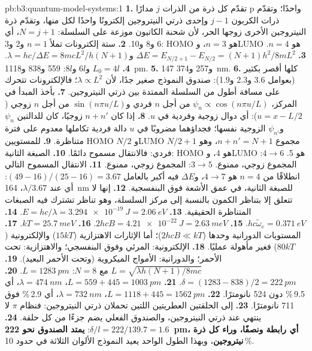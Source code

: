 \begin{solution}{pb:b3:quantum-model-systems:1}
\textbf{1.} تقدّم كل ذرة من الذرات $j$ مدارًا p واحدًا؛ وتقدّم ذرات الكربون $j - 1$ 
وإحدى ذرتي النيتروجين إلكترونًا واحدًا لكل منها، وتقدّم ذرة النيتروجين الأخرى زوجها الحر،
لأن شحنة الكاتيون موزعة على السلسلة: $N = j + 1$، أي 6
و8 و10.
\textbf{2.} ستة إلكترونات تملأ $n = 1$ و2 و3: HOMO هو $n = 3$، وLUMO هو $n = 4$.
\textbf{3.} $\Delta E = E_{N/2+1} - E_{N/2} = (N+1)h^2/8mL^2$ و$\lambda =
hc/\Delta E = 8mcL^2/h(N+1)$.
\textbf{4.} $L_0 = 4l$ و$6l$ و$8l$: 559 و838 و\qty{1118}{pm}.
\textbf{5.} 147 و257 و\qty{374}{nm}.
\textbf{6.} كلها أقصر بكثير (بعوامل 3.6 و2.3 و1.9): صندوق النموذج
صغير جدًا، لأن $\lambda \propto L^2$؛ فالإلكترونات تتحرك على مسافة أطول
من السلسلة الممتدة بين ذرتي النيتروجين.
\textbf{7.} بأخذ المبدأ في المركز، $\psi_n \propto \cos(n\pi u/L)$ من أجل
$n$ فردي و$\sin(n\pi u/L)$ من أجل $n$ زوجي ($u = x - L/2$): أي دوال زوجية وفردية
في $u$.
\textbf{8.} إذا كان $n + n'$ زوجيًا، كان للدالتين $\psi_n$ و$\psi_{n'}$ الزوجية نفسها؛
فجداؤهما مضروبًا في $u$ دالة فردية تكاملها معدوم على فترة
متناظرة.
\textbf{9.} للمستويين HOMO $N/2$ وLUMO $N/2 + 1$ مجموع $n + n' = N + 1$، وهو فردي: فالانتقال
مسموح دائمًا.
\textbf{10.} الصبغة الثانية: HOMO هو 4، وLUMO هو 5. $4 \to 6$: المجموع زوجي، ممنوع.
$3 \to 5$: المجموع زوجي، ممنوع.
\textbf{11.} الانتقال المسموح التالي انطلاقًا من $n = 4$ هو $4 \to 7$، 
و$\Delta E$ فيه أكبر بالعامل $(49 - 16)/(25 - 16) = 3.67$: أي عند $\lambda/3.67$،
\qty{164}{nm} للصبغة الثانية، في عمق الأشعة فوق البنفسجية.
\textbf{12.} إنها لا تتعلق إلا بتناظر الكمون بالنسبة إلى مركز
السلسلة، وهو تناظر تشترك فيه الصبغات المتناظرة الحقيقية.
\textbf{13.} $E = hc/\lambda = \qty{3.294e-19}{J} = \qty{2.06}{eV}$.
\textbf{14.} $hc\tilde\omega_e = \qty{0.371}{eV}$.
\textbf{15.} $2hcB = \qty{4.21e-22}{J} = \qty{2.63}{meV}$.
\textbf{16.} $kT = \qty{25.7}{meV}$.
\textbf{17.} المستويات الدورانية وحدها ($2hcB \ll kT$)؛ أما الإثارات الاهتزازية ($15kT$) 
والإلكترونية ($80kT$) فغير مأهولة عمليًا.
\textbf{18.} الإلكترونية: المرئي وفوق البنفسجي؛ والاهتزازية: تحت الأحمر؛
والدورانية: الأمواج الميكروية (وتحت الأحمر البعيد).
\textbf{19.} $L = \sqrt{\lambda h(N+1)/8mc}$ مع $N = 8$: $L = \qty{1283}{pm}$.
\textbf{20.} $\delta = (1283 - 838)/2 = \qty{222}{pm}$.
\textbf{21.} $L = 559 + 445 = \qty{1003}{pm}$، $\lambda = \qty{474}{nm}$، أي 9.5\,\%
دون 524 نانومترًا.
\textbf{22.} $L = 1118 + 445 = \qty{1562}{pm}$، $\lambda = \qty{732}{nm}$، أي 2.9\,\%
فوق 711 نانومترًا.
\textbf{23.} إلى الحلقتين العطريتين اللتين تحملان ذرتي النيتروجين: فنظام $\pi$
لا ينتهي عند ذرتي النيتروجين، والصندوق الفعلي يضم
جزءًا من كل حلقة.
\textbf{24.} $\delta/l = 222/139.7 = 1.6$: \textbf{يمتد الصندوق نحو
\qty{222}{pm}، أي رابطة ونصفًا، وراء كل ذرة نيتروجين}، وبهذا الطول الواحد
يعيد النموذج الألوان الثلاثة في حدود 10\,\%.
\end{solution}

